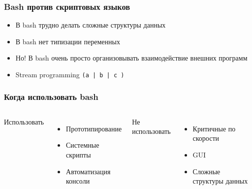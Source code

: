 \begin{frame}
  \frametitle{Bash против скриптовых языков}
  \begin{itemize}
   \item В bash трудно делать сложные структуры данных
   \item В bash нет типизации переменных
   \item Но! В bash очень просто организовывать взаимодействие внешних программ
   \item Stream programming \texttt{(a | b | c )}
  \end{itemize}
\end{frame}

\begin{frame}
  \frametitle{Когда использовать bash}
  \begin{columns}
    \begin{center}
     {\Large Использовать}
    \end{center}
    \begin{itemize}
      \item Прототипирование
      \item Системные скрипты
      \item Автоматизация консоли
    \end{itemize}
    \begin{center}
     {\Large Не использовать}
    \end{center}
    \begin{itemize}
      \item Критичные по скорости
      \item GUI
      \item Сложные структуры данных
    \end{itemize}
  \end{columns}
\end{frame}
